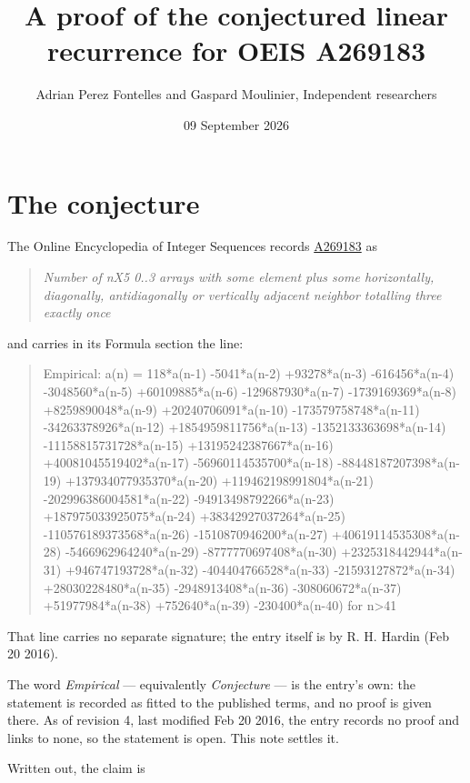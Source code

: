 \documentclass[11pt]{article}
\title{A proof of the conjectured linear recurrence for OEIS A269183}
\author{Adrian Perez Fontelles and Gaspard Moulinier, Independent researchers}
\date{09 September 2026}
\theoremstyle{definition}
\begin{document}
\maketitle
\section{The conjecture}

The Online Encyclopedia of Integer Sequences records \href{https://oeis.org/A269183}{A269183} as

\begin{quote}\itshape Number of nX5 0..3 arrays with some element plus some horizontally, diagonally, antidiagonally or vertically adjacent neighbor totalling three exactly once\end{quote}

and carries in its Formula section the line:

\begin{quote}\ttfamily Empirical: a(n) = 118*a(n-1) -5041*a(n-2) +93278*a(n-3) -616456*a(n-4) -3048560*a(n-5) +60109885*a(n-6) -129687930*a(n-7) -1739169369*a(n-8) +8259890048*a(n-9) +20240706091*a(n-10) -173579758748*a(n-11) -34263378926*a(n-12) +1854959811756*a(n-13) -1352133363698*a(n-14) -11158815731728*a(n-15) +13195242387667*a(n-16) +40081045519402*a(n-17) -56960114535700*a(n-18) -88448187207398*a(n-19) +137934077935370*a(n-20) +119462198991804*a(n-21) -202996386004581*a(n-22) -94913498792266*a(n-23) +187975033925075*a(n-24) +38342927037264*a(n-25) -110576189373568*a(n-26) -1510870946200*a(n-27) +40619114535308*a(n-28) -5466962964240*a(n-29) -8777770697408*a(n-30) +2325318442944*a(n-31) +946747193728*a(n-32) -404404766528*a(n-33) -21593127872*a(n-34) +28030228480*a(n-35) -2948913408*a(n-36) -308060672*a(n-37) +51977984*a(n-38) +752640*a(n-39) -230400*a(n-40) for n>41\end{quote}

That line carries no separate signature; the entry itself is by R. H. Hardin (Feb 20 2016).

The word {\itshape Empirical} --- equivalently {\itshape Conjecture} --- is the entry's own: the statement is recorded as fitted to the published terms, and no proof is given there. As of revision 4, last modified Feb 20 2016, the entry records no proof and links to none, so the statement is open. This note settles it.

Written out, the claim is
\end{document}
